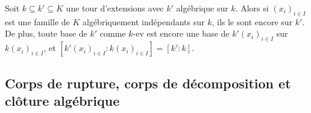 	\begin{pop}
		Soit $k \subseteq  k' \subseteq K$ une tour d'extensions avec $k'$ algébrique sur $k$.
		Alors si $(x_i)_{i \in I}$ est une famille de $K$ algébriquement indépendants sur $k$, ils le sont encore sur $k'$.
		De plus, toute base de $k'$ comme $k$-ev est encore une base de $k'(x_i)_{i \in I}$ sur $k(x_i)_{i \in I}$, et $[k'(x_i)_{i \in I} : k(x_i)_{i \in I}] = [k' : k]$.
	\end{pop}



\subsection{Corps de rupture, corps de décomposition et clôture algébrique}

	